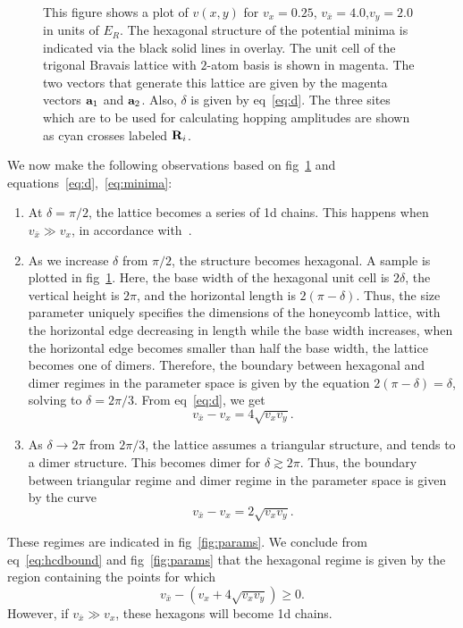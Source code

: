 \documentclass[a4paper,10pt]{article}
\begin{document}
\begin{figure}[h!bt]
\ 
\caption{This figure shows a plot of $v(x,y)$ for $v_x=0.25$, $v_{\bar{x}}=4.0$,$v_y=2.0$ in units of $E_R$. The hexagonal structure of the potential minima is indicated via the black solid lines in overlay. The unit cell of the trigonal Bravais lattice with $2$-atom basis is shown in  magenta. The two vectors that generate this lattice are given by the magenta vectors ${\bf a}_1$ and ${\bf a}_2$. Also, $\delta$ is given by eq~\ref{eq:d}. The three sites which are to be used for calculating hopping amplitudes are shown as cyan crosses labeled ${\bf R}_i$.}
\label{fig:potn}
\end{figure}
We now make the following observations based on fig~\ref{fig:potn} and equations~\ref{eq:d},~\ref{eq:minima}:
\begin{enumerate}
 \item 
At $\delta=\pi/2$, the lattice becomes a series of 1d chains. This happens when $v_{\bar{x}}\gg v_x$, in accordance with~\cite{laetitia}.
\item
As we increase $\delta$ from $\pi/2$, the structure becomes hexagonal. A sample is plotted in fig~\ref{fig:potn}. Here, the base width of the hexagonal unit cell is $2\delta$, the vertical height is $2\pi$, and the horizontal length is $2(\pi-\delta)$. Thus, the size parameter uniquely specifies the dimensions of the honeycomb lattice, with the horizontal edge decreasing in length while the base width increases, when the horizontal edge becomes smaller than half the base width, the lattice becomes one of dimers. Therefore, the boundary between hexagonal and dimer regimes in the parameter space is given by the equation $2(\pi-\delta)=\delta$, solving to $\delta=2\pi/3$. From eq~\ref{eq:d}, we get
\begin{equation}
 \label{eq:hcdbound}
{v_{\bar{x}}-v_{x}} = {4\sqrt{v_xv_y}}.
\end{equation}
\item
As $\delta\rightarrow 2\pi$ from $2\pi/3$, the lattice assumes a triangular structure, and tends to a dimer structure. This becomes dimer for $\delta\gtrsim2\pi$. Thus, the boundary between triangular regime and dimer regime in the parameter space is given by the curve
\begin{equation}
 \label{eq:tdbound}
{v_{\bar{x}}-v_{x}} = {2\sqrt{v_xv_y}}.
\end{equation}
\end{enumerate}
These regimes are indicated in fig~\ref{fig:params}. We conclude from eq~\ref{eq:hcdbound} and fig~\ref{fig:params} that the hexagonal regime is given by the region containing the points for which
\begin{equation}
 \label{eq:hcregime}
v_{\bar{x}} - \left(v_x + 4 \sqrt{v_xv_y}\right) \geq 0.
\end{equation}
However, if $v_{\bar{x}}\gg v_x$, these hexagons will become 1d chains. 
\end{document}
